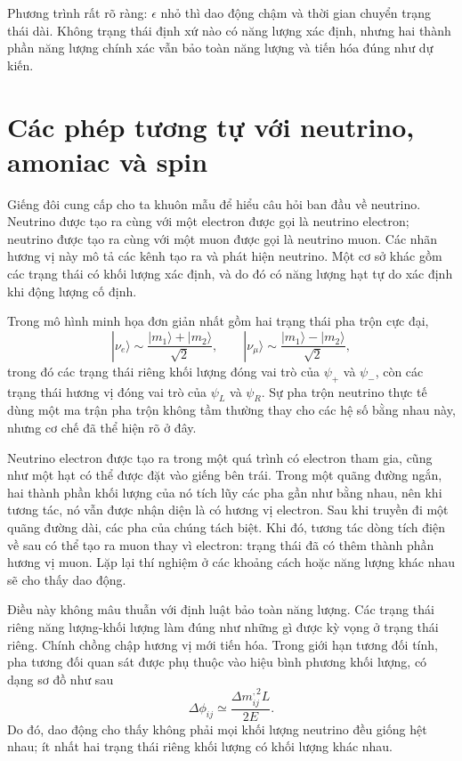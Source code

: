 Phương trình rất rõ ràng: \(\epsilon\) nhỏ thì dao động chậm và thời gian chuyển trạng thái dài. Không trạng thái định xứ nào có năng lượng xác định, nhưng hai thành phần năng lượng chính xác vẫn bảo toàn năng lượng và tiến hóa đúng như dự kiến.

\section{Các phép tương tự với neutrino, amoniac và spin}

Giếng đôi cung cấp cho ta khuôn mẫu để hiểu câu hỏi ban đầu về neutrino. Neutrino được tạo ra cùng với một electron được gọi là neutrino electron; neutrino được tạo ra cùng với một muon được gọi là neutrino muon. Các nhãn hương vị này mô tả các kênh tạo ra và phát hiện neutrino. Một cơ sở khác gồm các trạng thái có khối lượng xác định, và do đó có năng lượng hạt tự do xác định khi động lượng cố định.

Trong mô hình minh họa đơn giản nhất gồm hai trạng thái pha trộn cực đại,
\begin{equation}
|\nu_e\rangle \sim \frac{|m_1\rangle+|m_2\rangle}{\sqrt{2}},
\qquad
|\nu_\mu\rangle \sim \frac{|m_1\rangle-|m_2\rangle}{\sqrt{2}},
\end{equation}
trong đó các trạng thái riêng khối lượng đóng vai trò của \(\psi_+\) và \(\psi_-\), còn các trạng thái hương vị đóng vai trò của \(\psi_L\) và \(\psi_R\). Sự pha trộn neutrino thực tế dùng một ma trận pha trộn không tầm thường thay cho các hệ số bằng nhau này, nhưng cơ chế đã thể hiện rõ ở đây.

Neutrino electron được tạo ra trong một quá trình có electron tham gia, cũng như một hạt có thể được đặt vào giếng bên trái. Trong một quãng đường ngắn, hai thành phần khối lượng của nó tích lũy các pha gần như bằng nhau, nên khi tương tác, nó vẫn được nhận diện là có hương vị electron. Sau khi truyền đi một quãng đường dài, các pha của chúng tách biệt. Khi đó, tương tác dòng tích điện về sau có thể tạo ra muon thay vì electron: trạng thái đã có thêm thành phần hương vị muon. Lặp lại thí nghiệm ở các khoảng cách hoặc năng lượng khác nhau sẽ cho thấy dao động.

Điều này không mâu thuẫn với định luật bảo toàn năng lượng. Các trạng thái riêng năng lượng-khối lượng làm đúng như những gì được kỳ vọng ở trạng thái riêng. Chính chồng chập hương vị mới tiến hóa. Trong giới hạn tương đối tính, pha tương đối quan sát được phụ thuộc vào hiệu bình phương khối lượng, có dạng sơ đồ như sau
\begin{equation}
\Delta\phi_{ij}\simeq \frac{\Delta m_{ij}^{,2}L}{2E}.
\end{equation}
Do đó, dao động cho thấy không phải mọi khối lượng neutrino đều giống hệt nhau; ít nhất hai trạng thái riêng khối lượng có khối lượng khác nhau.

